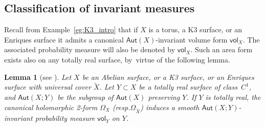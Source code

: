 \documentclass[11pt]{article}
\newcommand{\resp}{resp.\xspace}
\newcommand\Aut{\mathsf{Aut}}
\newcommand{\vol}{{\mathsf{vol}}}
\theoremstyle{plain}
\newtheorem{lem}[thm]{Lemma}
\theoremstyle{definition}
\numberwithin{equation}{section}
\begin{document}
\subsection{Classification of invariant measures}

Recall from Example~\ref{eg:K3_intro} that if $X$ is a torus, a K3 surface, or an Enriques surface it admits a canonical $\Aut(X)$-invariant volume form $\vol_X$. The associated probability measure will also be denoted by $\vol_X$. Such an area form exists also on any totally real surface, by~virtue of the following lemma.

\begin{lem}[{see \cite[Rem.\,2.3]{invariant}}]\label{lem:volume_Y}
Let $X$ be an Abelian surface, or a K3 surface, or an Enriques surface with universal cover $\tilde{X}$.
Let $Y\subset X$ be a totally real surface of class~$C^1$, and $\Aut(X;Y)$ be the
subgroup of $\Aut(X)$ preserving $Y$.
If $Y$ is totally real, the canonical holomorphic 2-form
$\Omega_X$ (\resp $\Omega_{\tilde{X}}$) induces a smooth $\Aut(X;Y)$-invariant probability
measure $\vol_Y$ on $Y$.
\end{lem}
\end{document}
